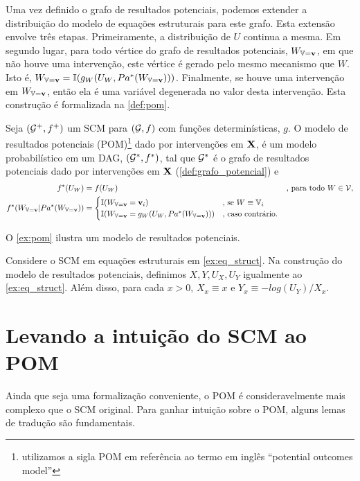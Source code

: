 Uma vez definido o grafo de resultados potenciais,
podemos extender a distribuição
do modelo de equações estruturais para este grafo.
Esta extensão envolve três etapas.
Primeiramente, a distribuição de $U$ continua a mesma.
Em segundo lugar, para todo 
vértice do grafo de resultados potenciais, $W_{{\mathbb V}={\mathbf{v}}}$, 
em que não houve uma intervenção, 
este vértice é gerado pelo mesmo mecanismo que $W$.
Isto é, $W_{{\mathbb V}={\mathbf{v}}} = {\mathbb I}(g_W(U_W, Pa^*(W_{{\mathbb V}={\mathbf{v}}})))$.
Finalmente, se houve uma intervenção em $W_{{\mathbb V}={\mathbf{v}}}$,
então ela é uma variável degenerada no valor desta intervenção.
Esta construção é formalizada na \cref{def:pom}.

\begin{definition}
 \label{def:pom}
 Seja $({\mathcal G}^+, f^+)$ um
 SCM para $({\mathcal G}, f)$
 com funções determinísticas, $g$.
 O modelo de resultados potenciais (POM)\footnote{
  utilizamos a sigla POM em referência ao
  termo em inglês ``potential outcomes model''} 
  dado por intervenções em ${\mathbf{X}}$,
 é um modelo probabilístico em um DAG, $({\mathcal G}^*, f^*)$, tal que
 ${\mathcal G}^*$ é o grafo de resultados potenciais
 dado por intervenções em ${\mathbf{X}}$ (\cref{def:grafo_potencial}) e
 \begin{align*}
  f^*(U_W) &= f(U_W) & \text{, para todo } W \in {\mathcal V}, \\
  f^*(W_{{\mathbb V}={\mathbf{v}}}|Pa^*(W_{{\mathbb V}={\mathbf{v}}}))
  &= 
  \begin{cases}
   {\mathbb I}(W_{{\mathbb V}={\mathbf{v}}} = {\mathbf{v}}_i) & \text{, se } W \equiv {\mathbb V}_i \\
   {\mathbb I}(W_{{\mathbb V}={\mathbf{v}}} = g_W(U_W, Pa^*(W_{{\mathbb V}={\mathbf{v}}}))) & \text{, caso contrário.}
  \end{cases}
 \end{align*}
\end{definition}

O \cref{ex:pom} ilustra 
um modelo de resultados potenciais.

\begin{example}
 \label{ex:pom}
 Considere o SCM em equações estruturais em \cref{ex:eq_struct}.
 Na construção do modelo de resultados potenciais,
 definimos $X, Y, U_X, U_Y$ igualmente ao \cref{ex:eq_struct}.
 Além disso, para cada $x > 0$,
 $X_{x} \equiv x$ e $Y_x \equiv -log(U_Y)/X_x$.
\end{example}

\section{Levando a intuição do SCM ao POM}
\label{sec:trad_scm_pom}

Ainda que seja uma formalização conveniente,
o POM é consideravelmente mais complexo que o SCM original.
Para ganhar intuição sobre o POM,
alguns lemas de tradução são fundamentais.

